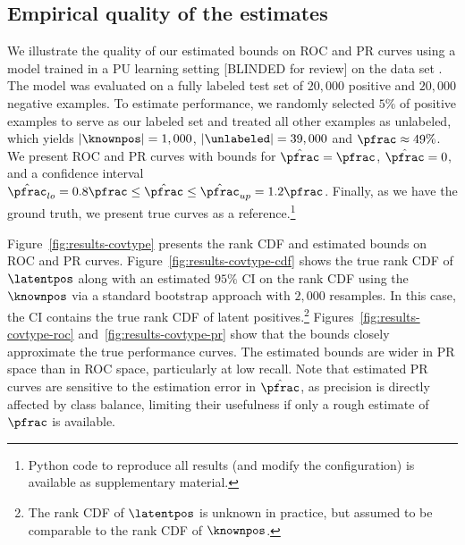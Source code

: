 \subsection{Empirical quality of the estimates} \label{empirical}
We illustrate the quality of our estimated bounds on ROC and PR curves using a model trained in a PU learning setting [BLINDED for review] on the \covtype data set \citep{Blackard00covtype}. The model was evaluated on a fully labeled test set of $20,000$ positive and $20,000$ negative examples. To estimate performance, we randomly selected $5\%$ of positive examples to serve as our labeled set and treated all other examples as unlabeled, which yields $|\knownpos|=1,000$, $|\unlabeled| = 39,000$ and $\pfrac\approx49\%$. We present ROC and PR curves with bounds for $\hat{\pfrac}=\pfrac$, $\hat{\pfrac}=0$, and a confidence interval $\hat{\pfrac}_{lo} = 0.8\pfrac \leq \hat{\pfrac} \leq \hat{\pfrac}_{up} = 1.2\pfrac$. Finally, as we have the ground truth, we present true curves as a reference.\footnote{Python code to reproduce all results (and modify the configuration) is available as supplementary material.}

Figure~\ref{fig:results-covtype} presents  the rank CDF and estimated bounds on ROC and PR curves. Figure~\ref{fig:results-covtype-cdf} shows the true rank CDF of $\latentpos$ along with an estimated $95\%$ CI on the rank CDF using the $\knownpos$ via a standard bootstrap approach with $2,000$ resamples. In this case, the CI contains the true rank CDF of latent positives.\footnote{The rank CDF of $\latentpos$ is unknown in practice, but assumed to be comparable to the rank CDF of $\knownpos$.} Figures~\ref{fig:results-covtype-roc} and~\ref{fig:results-covtype-pr} show that the bounds closely approximate the true performance curves. The estimated bounds are wider in PR space than in ROC space, particularly at low recall. Note that estimated PR curves are sensitive to the estimation error in $\hat{\pfrac}$, as precision is directly affected by class balance, limiting their usefulness if only a rough estimate of $\pfrac$ is available.


